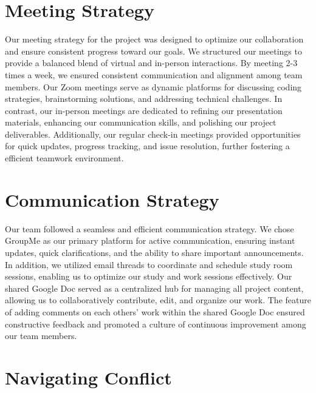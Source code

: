 \documentclass[
]{book}
\begin{document}
\hypertarget{meeting-strategy}{%
\section{Meeting Strategy}\label{meeting-strategy}}

Our meeting strategy for the project was designed to optimize our collaboration and ensure consistent progress toward our goals. We structured our meetings to provide a balanced blend of virtual and in-person interactions. By meeting 2-3 times a week, we ensured consistent communication and alignment among team members. Our Zoom meetings serve as dynamic platforms for discussing coding strategies, brainstorming solutions, and addressing technical challenges. In contrast, our in-person meetings are dedicated to refining our presentation materials, enhancing our communication skills, and polishing our project deliverables. Additionally, our regular check-in meetings provided opportunities for quick updates, progress tracking, and issue resolution, further fostering a efficient teamwork environment.

\hypertarget{communication-strategy}{%
\section{Communication Strategy}\label{communication-strategy}}

Our team followed a seamless and efficient communication strategy. We chose GroupMe as our primary platform for active communication, ensuring instant updates, quick clarifications, and the ability to share important announcements. In addition, we utilized email threads to coordinate and schedule study room sessions, enabling us to optimize our study and work sessions effectively. Our shared Google Doc served as a centralized hub for managing all project content, allowing us to collaboratively contribute, edit, and organize our work. The feature of adding comments on each others' work within the shared Google Doc ensured constructive feedback and promoted a culture of continuous improvement among our team members.

\hypertarget{navigating-conflict}{%
\section{Navigating Conflict}\label{navigating-conflict}}
\end{document}
